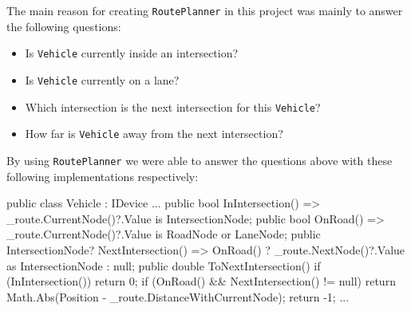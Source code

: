 The main reason for creating \verb*|RoutePlanner| in this project was mainly to answer the following questions:
\begin{itemize}
	\item Is \verb*|Vehicle| currently inside an intersection?
	\item Is \verb*|Vehicle| currently on a lane?
	\item Which intersection is the next intersection for this \verb*|Vehicle|?
	\item How far is \verb*|Vehicle| away from the next intersection?
\end{itemize}
By using \verb*|RoutePlanner| we were able to answer the questions above with these following implementations respectively:
\begin{csharp}
public class Vehicle : IDevice
{
	...
	public bool InIntersection() => 
		_route.CurrentNode()?.Value is IntersectionNode;
	public bool OnRoad() => 
		_route.CurrentNode()?.Value is RoadNode or LaneNode;
	public IntersectionNode? NextIntersection() =>
		OnRoad() ? _route.NextNode()?.Value as IntersectionNode : null;
	public double ToNextIntersection()
	{
		if (InIntersection())
			return 0;
		if (OnRoad() && NextIntersection() != null)
			return Math.Abs(Position - _route.DistanceWithCurrentNode);
		return -1;
	}
	...
}
\end{csharp}

